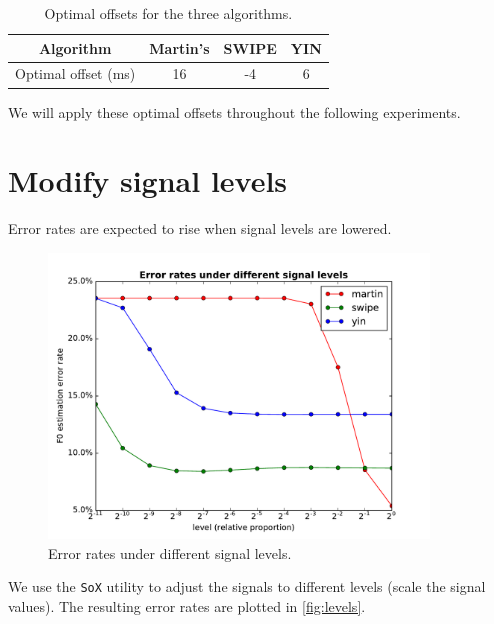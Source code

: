 \documentclass[11pt,a4paper]{report}
\begin{document}
\begin{table}[htbp]
  \centering
  \begin{tabular}{cSSS}
  	\toprule
  	             Algorithm              & {Martin's} & {SWIPE} & {YIN} \\
  	\midrule
  	Optimal offset (\si{\milli\second}) & 16         & -4      & 6     \\
  	\bottomrule
  \end{tabular}
  \caption{Optimal offsets for the three algorithms.} \label{tab:offsets}
\end{table}

We will apply these optimal offsets throughout the following experiments.

\newpage

\section{Modify signal levels}

Error rates are expected to rise when signal levels are lowered.

\begin{figure}[htbp]
  \centering
  \includegraphics[width=0.9\textwidth]{error_rates_vs_signal_levels.pdf}
  \caption{Error rates under different signal levels.} \label{fig:levels}
\end{figure}

We use the \texttt{SoX} utility to adjust the signals to different levels (scale the signal values).
The resulting error rates are plotted in \autoref{fig:levels}.
\end{document}
